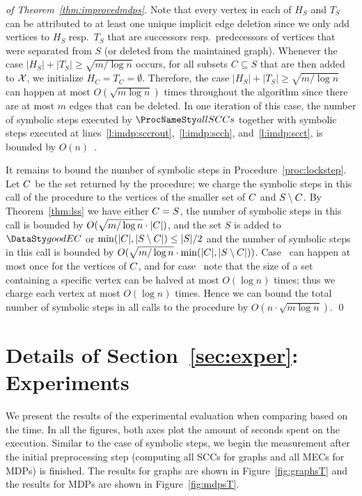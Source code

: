 \begin{proof}[of Theorem~\ref{thm:improvedmdps}]
 	
Note that every vertex in each of $H_S$ and $T_S$ can be attributed to at least one unique
implicit edge deletion since we only add vertices to $H_S$ resp.\ $T_S$ that are successors
resp.\ predecessors of vertices that were separated from $S$ (or deleted from the
maintained graph). Whenever the case $\lvert H_S \rvert + \lvert T_S \rvert \ge \sqrt{m / \log{n}}$
occurs, for all subsets $C \subseteq S$ that are then added to $\mathcal{X}$, we initialize
$H_C = T_C = \emptyset$. Therefore, the case $\lvert H_S \rvert + \lvert T_S \rvert \ge \sqrt{m / \log{n}}$
can happen at most $O(\sqrt{m \log{n}})$ times throughout the algorithm since
there are at most $m$ edges that can be deleted. In one iteration of this case, the number
of symbolic steps executed by $\sccalg$ together with symbolic steps executed at
lines~\ref{l:imdp:sccrout},~\ref{l:imdp:scch}, and~\ref{l:imdp:scct}, is bounded by $O(n)$~\cite{GentiliniPP08}.

It remains to bound the number of symbolic steps in Procedure~\ref{proc:lockstep}. Let $C$ be the set
returned by the procedure; we charge the symbolic steps in this call of the procedure to the vertices of 
the smaller set of $C$ and $S \setminus C$. By Theorem~\ref{thm:lss} we have either 
$C = S$, the number of symbolic steps in this call is bounded by $O(\sqrt{m/\log{n}} \cdot \lvert C \rvert)$,
and the set $S$ is added to $\good$ or 
$\min(\lvert C \rvert, \lvert S \setminus C \rvert) \le \lvert S \rvert / 2$ and the number of symbolic steps
in this call is bounded by $O(\sqrt{m/\log{n}} \cdot \min(\lvert C \rvert, \lvert S \setminus C \rvert))$.
Case~ can happen at most once for the vertices of $C$, and for case~ note that the size
of a set containing a specific vertex can be halved at most $O(\log{n})$ times; thus we charge each vertex at 
most $O(\log{n})$ times. Hence we can bound the total number of symbolic steps in all calls to the procedure
by $O(n \cdot \sqrt{m \log{n}})$.
\qed
\end{proof}


\section{Details of Section~\ref{sec:exper}: Experiments}\label{sec:appexper}

We present the results of the experimental evaluation when comparing based on the time.
In all the figures, both axes plot the amount of seconds spent on the execution. Similar
to the case of symbolic steps, we begin the measurement after the initial preprocessing
step (computing all SCCs for graphs and all MECs for MDPs) is finished. The results for
graphs are shown in Figure~\ref{fig:graphsT} and the results for MDPs are shown in 
Figure~\ref{fig:mdpsT}.


